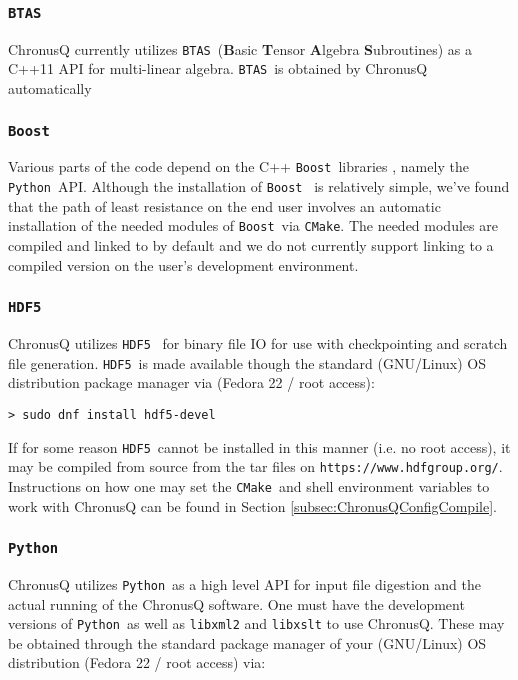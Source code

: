 \documentclass[12pt]{article}
\newcommand{\CMake}{\texttt{CMake}}
\newcommand{\BTAS}{\texttt{BTAS}}
\newcommand{\Boost}{\texttt{Boost}}
\newcommand{\HDF}{\texttt{HDF5}}
\newcommand{\Python}{\texttt{Python}}
\begin{document}
      \subsubsection{\BTAS} \label{subsubsec:BTAS}
        ChronusQ currently utilizes \BTAS~(\textbf{B}asic \textbf{T}ensor
        \textbf{A}lgebra \textbf{S}ubroutines) \cite{btas} as a C++11 API for multi-linear 
	algebra. \BTAS~is obtained by ChronusQ automatically

      \subsubsection{\Boost} \label{subsubsec:boost} 
        Various parts of the code depend on the C++ \Boost~libraries \cite{boost},
	namely the \Python~API.
	Although the installation of \Boost~ is relatively simple, we've found that
	the path of least resistance on the end user involves an automatic installation
	of the needed modules of \Boost~via \CMake. The needed modules are compiled
	and linked to by default and we do not currently support linking to a compiled
	version on the user's development environment.

      \subsubsection{\HDF} \label{subsubsec:HDF5} 
        ChronusQ utilizes \HDF~\cite{hdf5} for binary file IO for use with 
        checkpointing and scratch file generation. \HDF~is made available
	though the standard (GNU/Linux) OS distribution package manager via
	(Fedora 22 / root access):

	\begin{lstlisting}
> sudo dnf install hdf5-devel
	\end{lstlisting}

	\noindent If for some reason \HDF~cannot be installed in this manner (i.e. 
	no root access), it may be compiled from source from the tar files on
	\texttt{https://www.hdfgroup.org/}. Instructions on how one may set
	the \CMake~and shell environment variables to work with ChronusQ
	can be found in Section \ref{subsec:ChronusQConfigCompile}.

      \subsubsection{\Python} \label{subsubsec:Python} 
        ChronusQ utilizes \Python~as a high level API for input
        file digestion and the actual running of the ChronusQ software. One
	must have the development versions of \Python~as well as \texttt{libxml2} 
	and \texttt{libxslt} to use ChronusQ. These may be obtained through the 
	standard package manager of your (GNU/Linux) OS distribution (Fedora 22 /
	root access) via:
\end{document}
